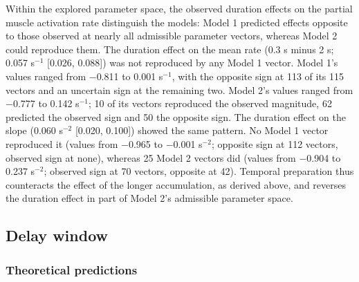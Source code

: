 \documentclass[a4paper,11pt]{article}
\theoremstyle{definition}
\newcommand{\1}{\mathbbm{1}}
\begin{document}
Within the explored parameter space, the observed duration effects on the partial muscle activation rate distinguish the models: Model 1 predicted effects opposite to those observed at nearly all admissible parameter vectors, whereas Model 2 could reproduce them. The duration effect on the mean rate (0.3 s minus 2 s; 0.057 s$^{-1}$ [0.026, 0.088]) was not reproduced by any Model 1 vector. Model 1's values ranged from $-$0.811 to 0.001 s$^{-1}$, with the opposite sign at 113 of its 115 vectors and an uncertain sign at the remaining two. Model 2's values ranged from $-$0.777 to 0.142 s$^{-1}$; 10 of its vectors reproduced the observed magnitude, 62 predicted the observed sign and 50 the opposite sign. The duration effect on the slope (0.060 s$^{-2}$ [0.020, 0.100]) showed the same pattern. No Model 1 vector reproduced it (values from $-$0.965 to $-$0.001 s$^{-2}$; opposite sign at 112 vectors, observed sign at none), whereas 25 Model 2 vectors did (values from $-$0.904 to 0.237 s$^{-2}$; observed sign at 70 vectors, opposite at 42). Temporal preparation thus counteracts the effect of the longer accumulation, as derived above, and reverses the duration effect in part of Model 2's admissible parameter space.


\subsection{Delay window}


\subsubsection{Theoretical predictions}
\end{document}
